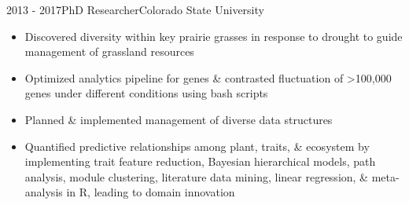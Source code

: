 \documentclass[letterpaper]{twentysecondcv} %
\begin{document}
\begin{twenty}
 \twentyitem
    	{2013 - }{2017}{PhD Researcher}{Colorado State University}
        	{}
        { \vspace{-1mm}
        {\begin{itemize}
        \item Discovered diversity within key prairie grasses in response to drought to guide management of grassland resources 
      		\vspace{1mm} 
	\item Optimized analytics pipeline for genes \& contrasted fluctuation of >100,000 genes under different conditions using bash scripts
		\vspace{1mm} 
	\item Planned \& implemented management of diverse data structures
	       \vspace{1mm} 
	\item Quantified predictive relationships among plant, traits, \& ecosystem by implementing trait feature reduction, Bayesian hierarchical models, path analysis, module clustering, literature data mining, linear regression, \& meta-analysis in R, leading to domain innovation
    \end{itemize}}  \vspace{6mm}  }

\end{twenty}
\end{document}
